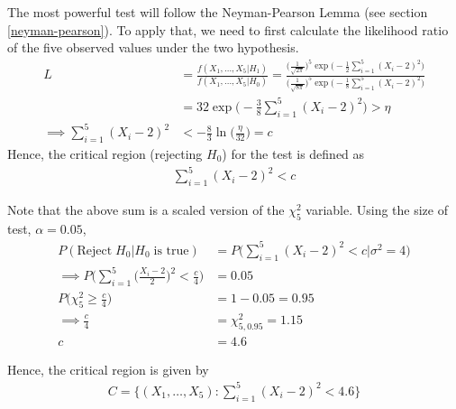 \documentclass[../../probability-notes.tex]{subfiles}
\begin{document}
    The most powerful test will follow the Neyman-Pearson Lemma (see section \ref{neyman-pearson}). To apply that, we need to first calculate the likelihood ratio of the five observed values under the two hypothesis.
    \begin{align*}
        L &= \frac{f(X_{1}, \ldots, X_{5} \lvert H_{1})}{f(X_{1}, \ldots, X_{5} \lvert H_{0})} =\frac{\bigg( \frac{1}{\sqrt{2 \pi }} \bigg)^{5} \exp \bigg(-\frac{1}{2} \sum_{i=1}^{5} (X_{i} - 2)^{2} \bigg)}{\bigg( \frac{1}{\sqrt{8 \pi}} \bigg)^{5} \exp \bigg( -\frac{1}{8} \sum_{i=1}^{5} (X_{i} - 2)^{2}\bigg)}\\
        &= 32 \exp \bigg(-\frac{3}{8} \sum_{i=1}^{5} (X_{i} - 2)^{2} \bigg) > \eta\\
        \implies \sum_{i=1}^{5} (X_{i} - 2)^{2} &< -\frac{8}{3} \ln \big( \frac{\eta}{32} \big) = c
    \end{align*}
    Hence, the critical region (rejecting $H_{0}$) for the test is defined as
    \begin{align*}
         \sum_{i=1}^{5} (X_{i} - 2)^{2} < c
     \end{align*}

     Note that the above sum is a scaled version of the $\chi_{5}^{2}$ variable. Using the size of test, $\alpha = 0.05$,
     \begin{align*}
         P(\text{Reject}\; H_{0} \lvert H_{0} \; \text{is true}) &= P \bigg(\sum_{i=1}^{5} (X_{i} - 2)^{2} < c \lvert \sigma^{2} = 4 \bigg)\\
         \implies P \bigg(\sum_{i=1}^{5} \bigg(\frac{X_{i} - 2}{2} \bigg)^{2} < \frac{c}{4} \bigg) &= 0.05\\
         P \bigg(\chi_{5}^{2} \geq \frac{c}{4} \bigg) &= 1 - 0.05 = 0.95\\
         \implies \frac{c}{4} &= \chi_{5, 0.95}^{2} = 1.15\\
         c &= 4.6
     \end{align*}

     Hence, the critical region is given by
     \begin{align*}
         C = \bigg\{ (X_{1}, \ldots, X_{5}) : \sum_{i=1}^{5} (X_{i} - 2)^{2} < 4.6 \bigg\}
     \end{align*}
\end{document}

